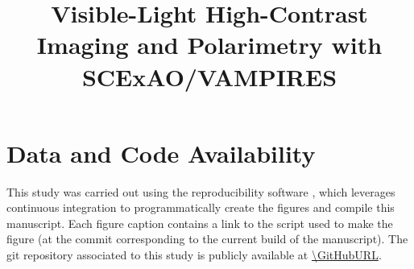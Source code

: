 \documentclass[twocolumn]{aastex631}
\begin{document}
\title{Visible-Light High-Contrast Imaging and Polarimetry with SCExAO/VAMPIRES}




% 


% 










\software{}



\appendix






\section{Data and Code Availability}
This study was carried out using the reproducibility software \href{https://github.com/showyourwork/showyourwork}{\showyourwork} \citep{luger_mapping_2021}, which leverages continuous integration to programmatically create the figures and compile this manuscript. Each figure caption contains a link to the script used to make the figure (at the commit corresponding to the current build of the manuscript). The git repository associated to this study is publicly available at \url{\GitHubURL}.
\end{document}

